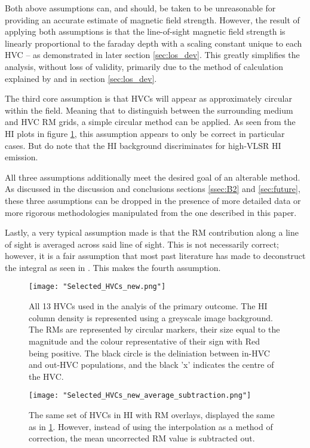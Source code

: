 Both above assumptions can, and should, be taken to be unreasonable for providing an accurate estimate of magnetic field strength. However, the result of applying both assumptions is that the line-of-sight magnetic field strength is linearly proportional to the faraday depth with a scaling constant unique to each HVC – as demonstrated in later section \ref{sec:los_dev}. This greatly simplifies the analysis, without loss of validity, primarily due to the method of calculation explained by \cite{ID27} and in section \ref{sec:los_dev}.


The third core assumption is that HVCs will appear as approximately circular within the field. Meaning that to distinguish between the surrounding medium and HVC RM grids, a simple circular method can be applied. As seen from the HI plots in figure \ref{fig:all_hvcs}, this assumption appears to only be correct in particular cases. But do note that the HI background discriminates for high-VLSR HI emission.


All three assumptions additionally meet the desired goal of an alterable method. As discussed in the discussion and conclusions sections \ref{ssec:B2} and \ref{sec:future}, these three assumptions can be dropped in the presence of more detailed data or more rigorous methodologies manipulated from the one described in this paper.


Lastly, a very typical assumption made is that the RM contribution along a line of sight is averaged across said line of sight. This is not necessarily correct; however, it is a fair assumption that most past literature has made to deconstruct the integral as seen in \cite{ID27, ID3, ID26}. This makes the fourth assumption.

\begin{figure}
    \texttt{[image: "Selected\_HVCs\_new.png"]}
    \centering
    \caption{All 13 HVCs used in the analyis of the primary outcome. The HI column density is represented using a greyscale image background. The RMs are represented by circular markers, their size equal to the magnitude and the colour representative of their sign with Red being positive. The black circle is the deliniation between in-HVC and out-HVC populations, and the black 'x' indicates the centre of the HVC.}
    \label{fig:all_hvcs}
\end{figure}

\begin{figure}
    \texttt{[image: "Selected\_HVCs\_new\_average\_subtraction.png"]}
    \centering
    \caption{The same set of HVCs in HI with RM overlays, displayed the same as in \ref{fig:all_hvcs}. However, instead of using the interpolation as a method of correction, the mean uncorrected RM value is subtracted out.}
    \label{fig:all_hvcs_avg}
\end{figure}


